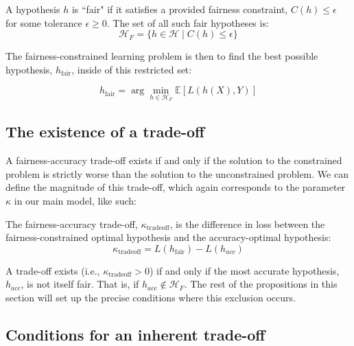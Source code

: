 \begin{definition}
A hypothesis $h$ is ``fair" if it satisfies a provided fairness constraint, $C(h) \leq \epsilon$ for some tolerance $\epsilon \geq 0$. The set of all such fair hypotheses is:
\begin{equation}
\mathcal{H}_F = \{h \in \mathcal{H} \mid C(h) \leq \epsilon \}
\end{equation}
\end{definition}

The fairness-constrained learning problem is then to find the best possible hypothesis, $h_{\text{fair}}$, inside of this restricted set:

\begin{equation}
h_{\text{fair}} = \arg\min_{h \in \mathcal{H}_F} \mathbb{E}[L(h(X), Y)]
\end{equation}

\subsection{The existence of a trade-off}

A fairness-accuracy trade-off exists if and only if the solution to the constrained problem is strictly worse than the solution to the unconstrained problem. We can define the magnitude of this trade-off, which again corresponds to the parameter $\kappa$ in our main model, like such:

\begin{definition}
The fairness-accuracy trade-off, $\kappa_{\text{tradeoff}}$, is the difference in loss between the fairness-constrained optimal hypothesis and the accuracy-optimal hypothesis:
\begin{equation}
\kappa_{\text{tradeoff}} = L(h_{\text{fair}}) - L(h_{acc})
\end{equation}
\end{definition}

A trade-off exists (i.e., $\kappa_{\text{tradeoff}} > 0$) if and only if the most accurate hypothesis, $h_{acc}$, is not itself fair. That is, if $h_{acc} \notin \mathcal{H}_F$. The rest of the propositions in this section will set up the precise conditions where this exclusion occurs.

\subsection{Conditions for an inherent trade-off}

